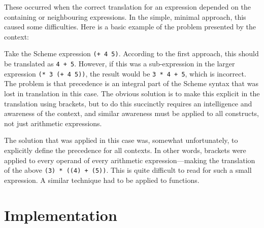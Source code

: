 These occurred when the correct translation for an expression depended on the
containing or neighbouring expressions. In the simple, minimal approach, this
caused some difficulties. Here is a basic example of the problem presented by
the context:
\begin{framed}
Take the Scheme expression \texttt{(+ 4 5)}. According to the first approach,
this should be translated as \texttt{4 + 5}. However, if this was a
sub-expression in the larger expression \texttt{(*~3~(+~4~5))}, the result would
be \texttt{3~*~4~+~5}, which is incorrect. The problem is that precedence is
an integral part of the Scheme syntax that was lost in translation in this case.
The obvious solution is to make this explicit in the translation using brackets,
but to do this succinctly requires an intelligence and awareness of the context,
and similar awareness must be applied to all constructs, not just arithmetic
expressions.
\end{framed}
The solution that was applied in this case was, somewhat unfortunately, to
explicitly define the precedence for all contexts. In other words, brackets were
applied to every operand of every arithmetic expression---making the translation
of the above \texttt{(3) * ((4) + (5))}. This is quite difficult to read for
such a small expression. A similar technique had to be applied to functions.


\section{Implementation}

